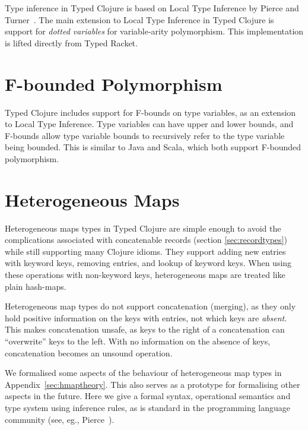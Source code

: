 Type inference in Typed Clojure is based on Local Type Inference
by Pierce and Turner~\cite{PT00}.
The main extension to Local Type Inference in Typed Clojure
is support for \emph{dotted variables} for variable-arity polymorphism.
This implementation is lifted directly from Typed Racket.

\section{F-bounded Polymorphism}

Typed Clojure includes support for F-bounds on type variables\cite{CCHOM89}, as an extension
to Local Type Inference. 
Type variables can have upper and lower bounds, and F-bounds allow type variable bounds
to recursively refer to the type variable being bounded.
This is similar to Java and Scala, which both support F-bounded polymorphism.

\section{Heterogeneous Maps}
\label{ref:designhmap}

Heterogeneous maps types in Typed Clojure are simple enough to avoid
the complications associated with concatenable records (section \ref{sec:recordtypes})
while still supporting many Clojure idioms.
They support adding new entries with keyword keys, removing entries,
and lookup of keyword keys.
When using these operations with non-keyword keys, heterogeneous maps
are treated like plain hash-maps.

Heterogeneous map types do not support concatenation (merging), as they
only hold positive information on the keys with entries, not
which keys are \emph{absent}.
This makes concatenation unsafe, as keys to the right of a
concatenation can ``overwrite'' keys to the left. With no information
on the absence of keys, concatenation becomes an unsound operation.

We formalised some aspects of the behaviour of heterogeneous map types in Appendix~\ref{sec:hmaptheory}.
This also serves as a prototype for formalising other aspects in the future.
Here we give a formal syntax, operational semantics and type system using inference
rules, as is standard in the programming language community (see, eg., Pierce~\cite{Pie02}).

